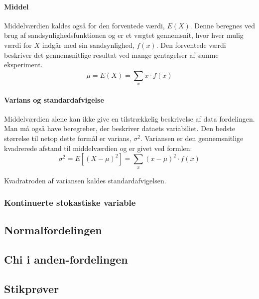 \paragraph{Middel} Middelværdien kaldes også for den forventede værdi, $E(X)$. Denne beregnes ved brug af sandsynlighedsfunktionen og er et vægtet gennemsnit, hvor hver mulig værdi for $X$ indgår med sin sandsynlighed, $f(x)$. Den forventede værdi beskriver det gennemsnitlige resultat ved mange gentagelser af samme eksperiment.
$$\mu=E(X)=\sum_{x}^{}x \cdot f(x)$$

\paragraph{Varians og standardafvigelse} Middelværdien alene kan ikke give en tilstrækkelig beskrivelse af data fordelingen. Man må også have beregreber, der beskriver dataets variabiliet. Den bedste størrelse til netop dette formål er varians, $\sigma ^2$. Variansen er den gennemsnitlige kvadrerede afstand til middelværdien og er givet ved formlen:
$$\sigma ^2=E[(X-\mu)^2]=\sum_{x}^{}(x-\mu)^2 \cdot f(x)$$

Kvadratroden af variansen kaldes standardafvigelsen.

\subsubsection{Kontinuerte stokastiske variable}

\subsection{Normalfordelingen}

\subsection{Chi i anden-fordelingen}

\subsection{Stikprøver}